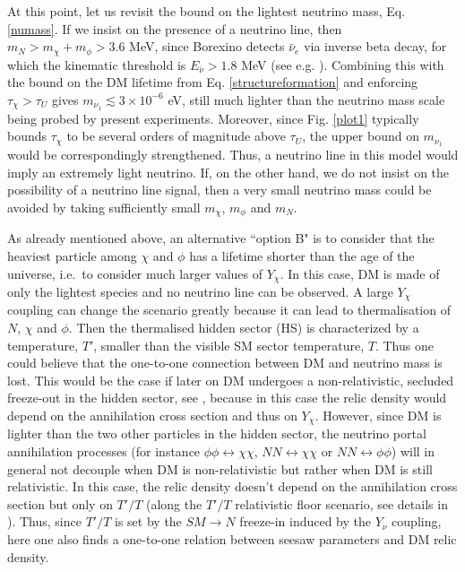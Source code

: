 \documentclass[prd,a4paper,twocolumn,preprintnumbers,nofootinbib,superscriptaddress]{revtex4}
\begin{document}
	
At this point, let us revisit the bound on the lightest neutrino mass, Eq. \eqref{numass}. 
If we insist on the presence of a neutrino line, then $m_N > m_\chi + m_\phi > 3.6$ MeV, since Borexino detects $\bar{\nu}_e$ via inverse beta decay, for which the kinematic threshold is $E_{\bar{\nu}} > 1.8$ MeV (see e.g. \cite{Garcia-Cely:2017oco}). 
Combining this with the bound on the DM lifetime from Eq. \eqref{structureformation} and enforcing $\tau_\chi > \tau_U$ gives $m_{\nu_1} \lesssim 3 \times 10^{-6}$ eV, still much lighter than the neutrino mass scale being probed by present experiments.  
Moreover, since Fig. \ref{plot1} typically bounds $\tau_\chi$ to be several orders of magnitude above $\tau_U$, the upper bound on $m_{\nu_1}$ would be correspondingly strengthened. 
Thus, a neutrino line in this model would imply an extremely light neutrino. 
If, on the other hand, we do not insist on the possibility of a neutrino line signal, then a very small neutrino mass could be avoided by taking sufficiently small $m_\chi$, $m_\phi$ and $m_N$. 
	
	
As already mentioned above, an alternative ``option B" is to consider that the heaviest  particle among $\chi$ and $\phi$ has a lifetime shorter than the age of the universe, i.e.~to consider much larger values of $Y_\chi$. In this case, DM is made of only the lightest species and no neutrino line can be observed. %
A large $Y_\chi$ coupling can change the scenario greatly because it can lead to thermalisation of $N$, $\chi$ and $\phi$. Then the thermalised hidden sector (HS) is characterized by a temperature, $T'$, smaller than the visible SM sector temperature, $T$. Thus one could believe that the one-to-one connection between DM and neutrino mass is lost. This would be the case if later on DM undergoes a non-relativistic, secluded freeze-out in the hidden sector, see  \cite{Feng:2009mn,Chu:2011be}, because in this case the relic density would depend on the annihilation cross section and thus on $Y_\chi$. However, since DM is lighter than the two other particles in the hidden sector, the neutrino portal annihilation processes (for instance $\phi \phi \leftrightarrow \chi\chi$, $N N \leftrightarrow \chi\chi$ or $N N \leftrightarrow \phi\phi$) will in general not decouple when DM is non-relativistic but rather when DM is still relativistic. 
In this case, the relic density doesn't depend on the annihilation cross section but only on $T'/T$ (along the $T'/T$ relativistic floor scenario, see details in \cite{Hambye:2020lvy}). Thus, since $T'/T$ is set by the $SM\rightarrow N$ freeze-in induced by the $Y_\nu$ coupling, here one also finds a one-to-one relation between seesaw parameters and DM relic density. 
	
\end{document}
